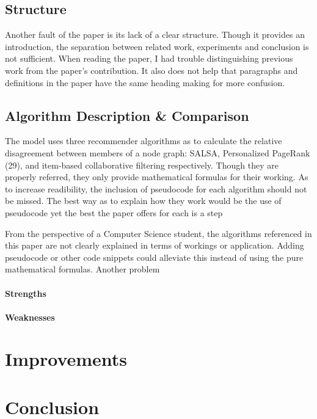 \documentclass[14]{article}
\begin{document}
\subsection{Structure}
Another fault of the paper is its lack of a clear structure. Though it provides an introduction, the separation between related work, experiments and conclusion is not sufficient. When reading the paper, I had trouble distinguishing previous work from the paper's contribution. It also does not help that paragraphs and definitions in the paper have the same heading making for more confusion.

\subsection{Algorithm Description \& Comparison}
The model uses three recommender algorithms as to calculate the relative disagreement between members of a node graph: SALSA, Personalized PageRank (29), and item-based collaborative filtering respectively. Though they are properly referred, they only provide mathematical formulas for their working. As to increase readibility, the inclusion of pseudocode for each algorithm should not be missed. The best way as to explain how they work would be the use of pseudocode yet the best the paper offers for each is a step 

From the perspective of a Computer Science student, the algorithms referenced in this paper are not clearly explained in terms of workings or application. Adding pseudocode or other code snippets could alleviate this instead of using the pure mathematical formulas. Another problem

\paragraph{Strengths}

\paragraph{Weaknesses}

\section{Improvements}

\section{Conclusion}


	
\end{document}
